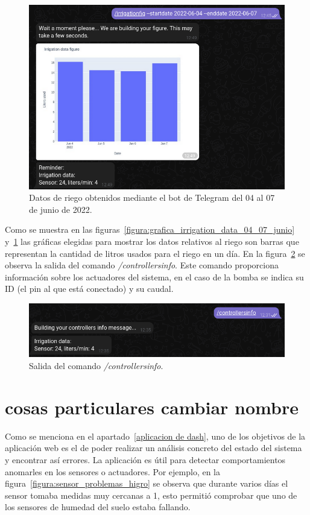\documentclass[a4paper, 12pt, oneside]{book}
\begin{document}
\begin{figure}[H]
	\centering
    \includegraphics[width=12cm, keepaspectratio]{img/irrigationfig_04_07_junio}
    \caption{Datos de riego obtenidos mediante el bot de Telegram del 04 al 07 de junio de 2022.}
    \label{figura:irrigationfig_04_07_junio}
\end{figure}

Como se muestra en las figuras~\ref{figura:grafica_irrigation_data_04_07_junio} y~\ref{figura:irrigationfig_04_07_junio} las gráficas elegidas para mostrar los datos relativos al riego son barras que representan la cantidad de litros usados para el riego en un día. En la figura~\ref{figura:comando controllers info} se observa la salida del comando \textit{/controllersinfo}. Este comando proporciona información sobre los actuadores del sistema, en el caso de la bomba se indica su ID (el pin al que está conectado) y su caudal.

\begin{figure}[H]
	\centering
    \includegraphics[width=12cm, keepaspectratio]{img/controllers_info}
    \caption{Salida del comando \textit{/controllersinfo}.}
    \label{figura:comando controllers info}
\end{figure}


\section{cosas particulares cambiar nombre}
\label{sec:cosas particulares cambiar nombre}
Como se menciona en el apartado~\ref{aplicacion de dash}, uno de los objetivos de la aplicación web es el de poder realizar un análisis concreto del estado del sistema y encontrar así errores.
La aplicación es útil para detectar comportamientos anomarles en los sensores o actuadores. Por ejemplo, en la figura~\ref{figura:sensor_problemas_higro} se observa que durante varios días el sensor tomaba medidas muy cercanas a 1, esto permitió comprobar que uno de los sensores de humedad del suelo estaba fallando.
\end{document}

